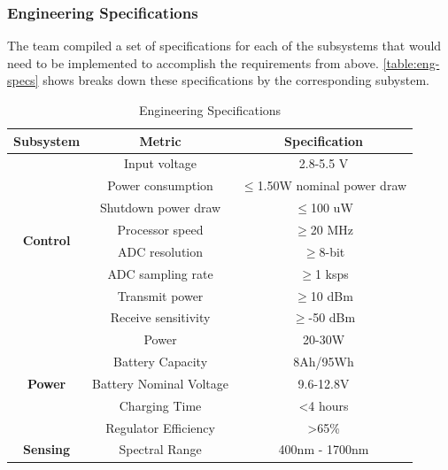 \subsubsection{Engineering Specifications}
The team compiled a set of specifications for each of the subsystems that would need to be implemented to accomplish the requirements from above. \autoref{table:eng-specs} shows breaks down these specifications by the corresponding subystem.
\begin{table}[H]
    \caption{Engineering Specifications}
    \centering
    \begin{tabular}{c|c|c}
        \hline
        \textbf{Subsystem} & \textbf{Metric} & \textbf{Specification} \\\cline{2-3}
        \hline
        \multirow{8}{*}{\textbf{Control}} & Input voltage & 2.8-5.5 V \\ \cline{2-3}
                                        & Power consumption & $\leq$1.50W nominal power draw \\ \cline{2-3}
                                        & Shutdown power draw   & $\leq$100 uW \\ \cline{2-3}
                                        & Processor speed       & $\geq$20 MHz \\ \cline{2-3}
                                        & ADC resolution        & $\geq$8-bit \\ \cline{2-3}
                                        & ADC sampling rate     & $\geq$1 ksps \\ \cline{2-3}
                                        & Transmit power        & $\geq$10 dBm \\ \cline{2-3}
                                        & Receive sensitivity   & $\geq$-50 dBm \\ \cline{2-3}
        \hline
        \multirow{5}{*}{\textbf{Power}} & Power & 20-30W \\\cline{2-3}
                                        & Battery Capacity & 8Ah/95Wh \\\cline{2-3}
                                        & Battery Nominal Voltage & 9.6-12.8V \\\cline{2-3}
                                        & Charging Time & \textless4 hours \\\cline{2-3}
                                        & Regulator Efficiency & \textgreater65\% \\\cline{2-3}
        \hline
        \multirow{3}{*}{\textbf{Sensing}} & Spectral Range & 400nm - 1700nm \\\cline{2-3}

\end{tabular}
\end{table}
